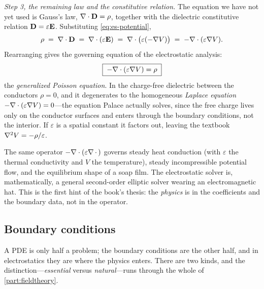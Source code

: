 \emph{Step 3, the remaining law and the constitutive relation.} The equation we
have not yet used is Gauss's law, $\nabla\cdot\mathbf{D} = \rho$, together with the dielectric
constitutive relation $\mathbf{D} = \varepsilon\mathbf{E}$. Substituting
\cref{eq:es-potential},
\begin{equation}
  \rho \;=\; \nabla\cdot\mathbf{D} \;=\; \nabla\cdot(\varepsilon\mathbf{E})
        \;=\; \nabla\cdot\bigl(\varepsilon(-\nabla V)\bigr)
        \;=\; -\nabla\cdot(\varepsilon\nabla V).
\end{equation}
Rearranging gives the governing equation of the electrostatic analysis:
\begin{equation}
  \boxed{\;-\nabla\cdot(\varepsilon\nabla V) = \rho\;}
  \label{eq:es-poisson}
\end{equation}
the \emph{generalized Poisson equation}. In the charge-free dielectric between
the conductors $\rho=0$, and it degenerates to the homogeneous
\emph{Laplace equation} $-\nabla\cdot(\varepsilon\nabla V)=0$---the equation Palace
actually solves, since the free charge lives only on the conductor surfaces and
enters through the boundary conditions, not the interior. If $\varepsilon$ is a
spatial constant it factors out, leaving the textbook $\nabla^2 V = -\rho/\varepsilon$.

\begin{remark}
The same operator $-\nabla\cdot(\varepsilon\nabla\,\cdot\,)$ governs steady heat
conduction (with $\varepsilon$ the thermal conductivity and $V$ the
temperature), steady incompressible potential flow, and the equilibrium shape of
a soap film. The electrostatic solver is, mathematically, a general second-order
elliptic solver wearing an electromagnetic hat. This is the first hint of the
book's thesis: the \emph{physics} is in the coefficients and the boundary data,
not in the operator.
\end{remark}

\subsection{Boundary conditions}

A PDE is only half a problem; the boundary conditions are the other half, and in
electrostatics they are where the physics enters. There are two kinds, and the
distinction---\emph{essential} versus \emph{natural}---runs through the whole of
\cref{part:fieldtheory}.

